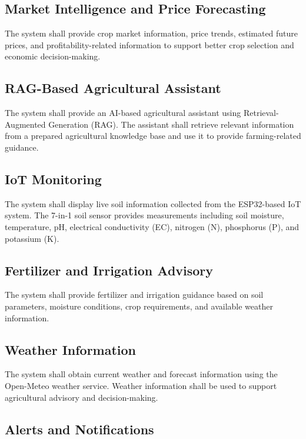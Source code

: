\subsection{Market Intelligence and Price Forecasting}

The system shall provide crop market information, price trends, estimated future prices, and profitability-related information to support better crop selection and economic decision-making.

\subsection{RAG-Based Agricultural Assistant}

The system shall provide an AI-based agricultural assistant using Retrieval-Augmented Generation (RAG). The assistant shall retrieve relevant information from a prepared agricultural knowledge base and use it to provide farming-related guidance.

\subsection{IoT Monitoring}

The system shall display live soil information collected from the ESP32-based IoT system. The 7-in-1 soil sensor provides measurements including soil moisture, temperature, pH, electrical conductivity (EC), nitrogen (N), phosphorus (P), and potassium (K).

\subsection{Fertilizer and Irrigation Advisory}

The system shall provide fertilizer and irrigation guidance based on soil parameters, moisture conditions, crop requirements, and available weather information.

\subsection{Weather Information}

The system shall obtain current weather and forecast information using the Open-Meteo weather service. Weather information shall be used to support agricultural advisory and decision-making.

\subsection{Alerts and Notifications}

